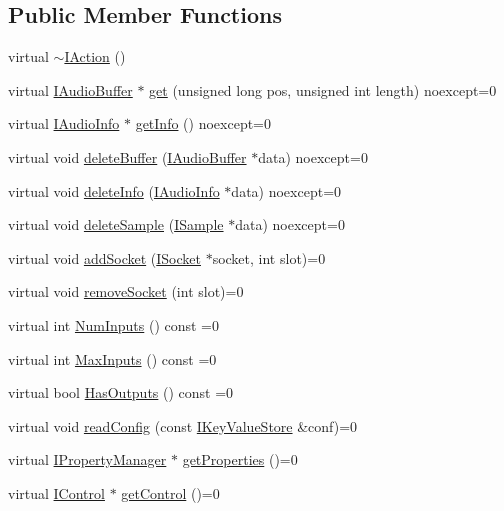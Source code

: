 \subsection*{Public Member Functions}
\begin{DoxyCompactItemize}
\item 
virtual \hyperlink{classmaudio_1_1IAction_af416e7ca1070c5b5b48e223664831056}{$\sim$\-I\-Action} ()
\item 
virtual \hyperlink{classmaudio_1_1IAudioBuffer}{I\-Audio\-Buffer} $\ast$ \hyperlink{classmaudio_1_1IAction_adcd159456456b1104af6d4f31336fe59}{get} (unsigned long pos, unsigned int length) noexcept=0
\item 
virtual \hyperlink{classmaudio_1_1IAudioInfo}{I\-Audio\-Info} $\ast$ \hyperlink{classmaudio_1_1IAction_abf9d7d1a4d66fd1b48d946d672bfe7a0}{get\-Info} () noexcept=0
\item 
virtual void \hyperlink{classmaudio_1_1IAction_a6be8c626cd3043c4114d9cf998fd0388}{delete\-Buffer} (\hyperlink{classmaudio_1_1IAudioBuffer}{I\-Audio\-Buffer} $\ast$data) noexcept=0
\item 
virtual void \hyperlink{classmaudio_1_1IAction_af02a219faa2361dd14759e1e92003d33}{delete\-Info} (\hyperlink{classmaudio_1_1IAudioInfo}{I\-Audio\-Info} $\ast$data) noexcept=0
\item 
virtual void \hyperlink{classmaudio_1_1IAction_ae4bdc7487e1229ded107ff8d42275bd3}{delete\-Sample} (\hyperlink{classmaudio_1_1ISample}{I\-Sample} $\ast$data) noexcept=0
\item 
virtual void \hyperlink{classmaudio_1_1IAction_a0dac443df118fafeb020d2254d3c8c8a}{add\-Socket} (\hyperlink{classmaudio_1_1ISocket}{I\-Socket} $\ast$socket, int slot)=0
\item 
virtual void \hyperlink{classmaudio_1_1IAction_aa562ad351f4923aeef7d8a7c0450d74e}{remove\-Socket} (int slot)=0
\item 
virtual int \hyperlink{classmaudio_1_1IAction_ad850f2f577a12e41c71994479773079f}{Num\-Inputs} () const =0
\item 
virtual int \hyperlink{classmaudio_1_1IAction_a3c8825e7f38e0de769af7d81ccf6cf5e}{Max\-Inputs} () const =0
\item 
virtual bool \hyperlink{classmaudio_1_1IAction_a148ec76547dc1ac21e47b4b5d10c152a}{Has\-Outputs} () const =0
\item 
virtual void \hyperlink{classmaudio_1_1IAction_a610804d37c46509f3eaa1aebceab7e35}{read\-Config} (const \hyperlink{classmaudio_1_1IKeyValueStore}{I\-Key\-Value\-Store} \&conf)=0
\item 
virtual \hyperlink{classmaudio_1_1IPropertyManager}{I\-Property\-Manager} $\ast$ \hyperlink{classmaudio_1_1IAction_a59edeb0de77724d42bc51e9b7f7b6d41}{get\-Properties} ()=0
\item 
virtual \hyperlink{classmaudio_1_1IControl}{I\-Control} $\ast$ \hyperlink{classmaudio_1_1IAction_a0103686135171d24dc7901a81ae77ace}{get\-Control} ()=0
\end{DoxyCompactItemize}


